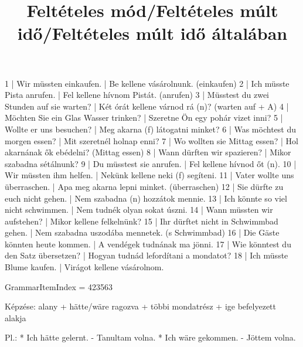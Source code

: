 \begin{exmp}
1 | Wir müssten einkaufen. | Be kellene vásárolnunk. (einkaufen)
2 | Ich müsste Pista anrufen. | Fel kellene hívnom Pistát. (anrufen)
3 | Müsstest du zwei Stunden auf sie warten? | Két órát kellene várnod rá (n)? (warten auf + A)
4 | Möchten Sie ein Glas Wasser trinken? | Szeretne Ön egy pohár vizet inni?
5 | Wollte er uns besuchen? | Meg akarna (f) látogatni minket?
6 | Was möchtest du morgen essen? | Mit szeretnél holnap enni?
7 | Wo wollten sie Mittag essen? | Hol akarnának ők ebédelni? (Mittag essen)
8 | Wann dürften wir spazieren? | Mikor szabadna sétálnunk?
9 | Du müsstest sie anrufen. | Fel kellene hívnod őt (n).
10 | Wir müssten ihm helfen. | Nekünk kellene neki (f) segíteni.
11 | Vater wollte uns überraschen. | Apa meg akarna lepni minket. (überraschen)
12 | Sie dürfte zu euch nicht gehen. | Nem szabadna (n) hozzátok mennie.
13 | Ich könnte so viel nicht schwimmen. | Nem tudnék olyan sokat úszni.
14 | Wann müssten wir aufstehen? | Mikor kellene felkelnünk?
15 | Ihr dürftet nicht in Schwimmbad gehen. | Nem szabadna uszodába mennetek. (s Schwimmbad)
16 | Die Gäste könnten heute kommen. | A vendégek tudnának ma jönni.
17 | Wie könntest du den Satz übersetzen? | Hogyan tudnád lefordítani a mondatot?
18 | Ich müsste Blume kaufen. | Virágot kellene vásárolnom.
\end{exmp}

\title{Feltételes mód/Feltételes múlt idő/Feltételes múlt idő általában}

GrammarItemIndex = 423563

\begin{desc}
Képzése:
alany + hätte/wäre ragozva + többi mondatrész + ige befelyezett alakja

Pl.: * Ich hätte gelernt. - Tanultam volna.
* Ich wäre gekommen. - Jöttem volna.
\end{desc}

